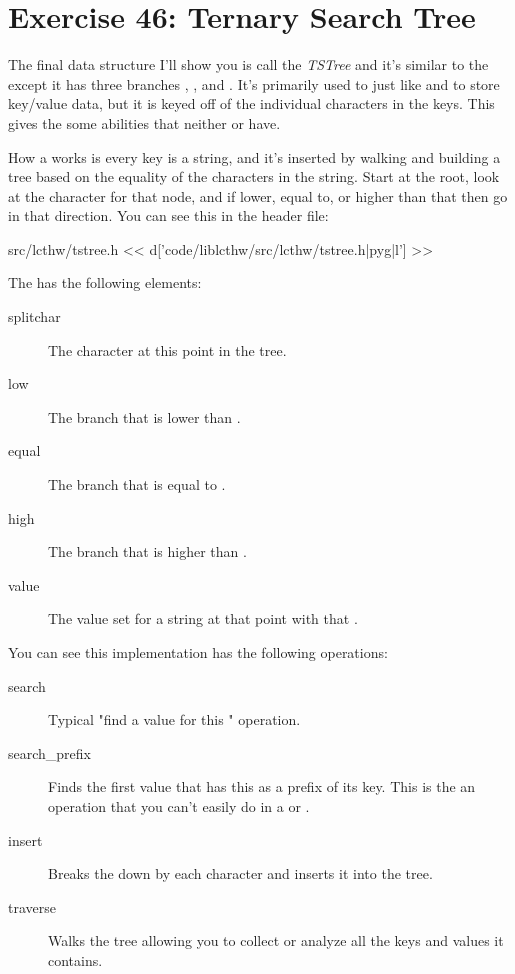 \chapter{Exercise 46: Ternary Search Tree}

The final data structure I'll show you is call the \emph{TSTree} and it's
similar to the  except it has three branches ,
, and .  It's primarily used to just like
 and  to store key/value data, but it is
keyed off of the individual characters in the keys.  This gives the
 some abilities that neither  or 
have.

How a  works is every key is a string, and it's inserted by
walking and building a tree based on the equality of the characters in
the string.  Start at the root, look at the character for that node, and
if lower, equal to, or higher than that then go in that direction.  You can
see this in the header file:

\begin{code}{src/lcthw/tstree.h}
<< d['code/liblcthw/src/lcthw/tstree.h|pyg|l'] >>
\end{code}

The  has the following elements:

\begin{description}
\item[splitchar] The character at this point in the tree.
\item[low] The branch that is lower than .
\item[equal] The branch that is equal to .
\item[high] The branch that is higher than .
\item[value] The value set for a string at that point with that .
\end{description}

You can see this implementation has the following operations:

\begin{description}
\item[search] Typical "find a value for this " operation.
\item[search\_prefix] Finds the first value that has this as a prefix of its key. 
    This is the an operation that you can't easily do in 
    a  or .
\item[insert] Breaks the  down by each character and inserts it 
    into the tree.
\item[traverse] Walks the tree allowing you to collect or analyze all the
    keys and values it contains.
\end{description} 

